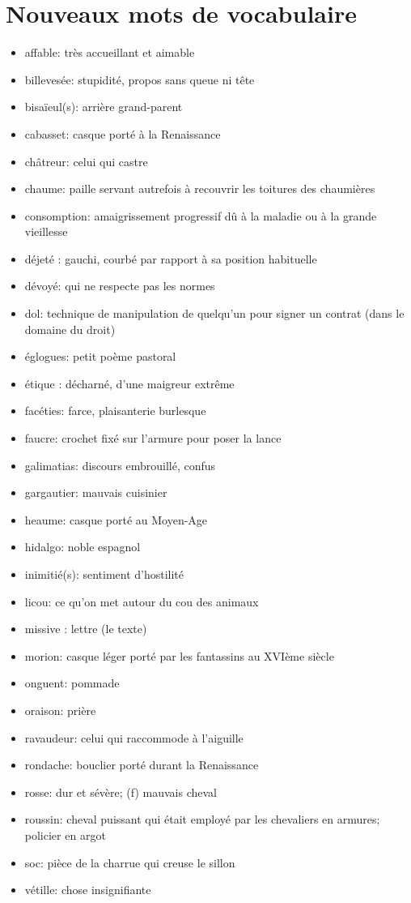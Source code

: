 \documentclass{article}
\begin{document}
\section{Nouveaux mots de vocabulaire}
\begin{itemize}
    \item affable: très accueillant et aimable
    \item billevesée: stupidité, propos sans queue ni tête
    \item bisaïeul(s): arrière grand-parent
    \item cabasset: casque porté à la Renaissance
    \item châtreur: celui qui castre
    \item chaume: paille servant autrefois à recouvrir les toitures des chaumières
    \item consomption: amaigrissement progressif dû à la maladie ou à la grande vieillesse
    \item déjeté : gauchi, courbé par rapport à sa position habituelle
    \item dévoyé: qui ne respecte pas les normes
    \item dol: technique de manipulation de quelqu'un pour signer un contrat (dans le domaine du droit)
    \item églogues: petit poème pastoral
    \item étique : décharné, d'une maigreur extrême
    \item facéties: farce, plaisanterie burlesque
    \item faucre: crochet fixé sur l'armure pour poser la lance
    \item galimatias: discours embrouillé, confus
    \item gargautier: mauvais cuisinier
    \item heaume: casque porté au Moyen-Age
    \item hidalgo: noble espagnol
    \item inimitié(s): sentiment d'hostilité
    \item licou: ce qu'on met autour du cou des animaux
    \item missive : lettre (le texte)
    \item morion: casque léger porté par les fantassins au XVIème siècle
    \item onguent: pommade
    \item oraison: prière
    \item ravaudeur: celui qui raccommode à l'aiguille
    \item rondache: bouclier porté durant la Renaissance
    \item rosse: dur et sévère; (f) mauvais cheval
    \item roussin: cheval puissant qui était employé par les chevaliers en armures; policier en argot
    \item soc: pièce de la charrue qui creuse le sillon
    \item vétille: chose insignifiante
\end{itemize}
\end{document}
